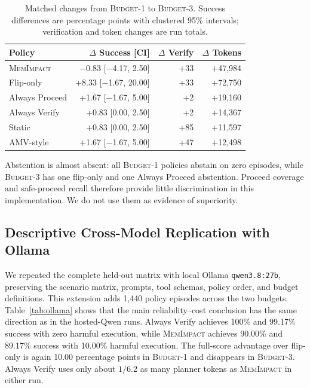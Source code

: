 \documentclass[11pt]{article}
\newcommand{\method}{\textsc{MemImpact}\xspace}
\newcommand{\BOne}{\textsc{Budget-1}\xspace}
\newcommand{\BThree}{\textsc{Budget-3}\xspace}
\begin{document}
\begin{table}[t]
\centering
\small
\caption{Matched changes from \BOne to \BThree. Success differences are percentage points with clustered 95\% intervals; verification and token changes are run totals.}
\label{tab:budget}
\begin{tabular}{lrrr}
\toprule
Policy & $\Delta$ Success [CI] & $\Delta$ Verify & $\Delta$ Tokens \\
\midrule
\method & $-$0.83 [$-$4.17, 2.50] & +33 & +47,984 \\
Flip-only & +8.33 [$-$1.67, 20.00] & +33 & +72,750 \\
Always Proceed & +1.67 [$-$1.67, 5.00] & +2 & +19,160 \\
Always Verify & +0.83 [0.00, 2.50] & +2 & +14,367 \\
Static & +0.83 [0.00, 2.50] & +85 & +11,597 \\
AMV-style & +1.67 [$-$1.67, 5.00] & +47 & +12,498 \\
\bottomrule
\end{tabular}
\end{table}

Abstention is almost absent: all \BOne policies abstain on zero episodes, while \BThree has one flip-only and one Always Proceed abstention. Proceed coverage and safe-proceed recall therefore provide little discrimination in this implementation. We do not use them as evidence of superiority.

\subsection{Descriptive Cross-Model Replication with Ollama}

We repeated the complete held-out matrix with local Ollama \texttt{qwen3.8:27b}, preserving the scenario matrix, prompts, tool schemas, policy order, and budget definitions. This extension adds 1,440 policy episodes across the two budgets. Table~\ref{tab:ollama} shows that the main reliability--cost conclusion has the same direction as in the hosted-Qwen runs. Always Verify achieves 100\% and 99.17\% success with zero harmful execution, while \method achieves 90.00\% and 89.17\% success with 10.00\% harmful execution. The full-score advantage over flip-only is again 10.00 percentage points in \BOne and disappears in \BThree. Always Verify uses only about $1/6.2$ as many planner tokens as \method in either run.
\end{document}
